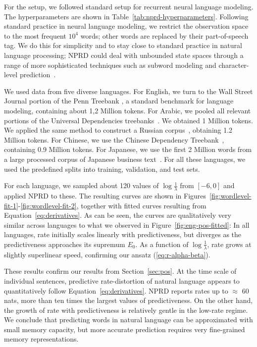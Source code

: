 \documentclass[entropy,article,submit,moreauthors,pdftex,10pt,a4paper]{Definitions/mdpi}
\begin{document}
For the setup, we followed standard setup for recurrent neural language modeling.
The hyperparameters are shown in Table~\ref{tab:nprd-hyperparameters}.
Following standard practice in neural language modeling, we restrict the observation space to the most frequent $10^4$ words; other words are replaced by their part-of-speech tag.
We do this for simplicity and to stay close to standard practice in natural language processing; NPRD could deal with unbounded state spaces through a range of more sophisticated techniques such as subword modeling and character-level prediction~\citep{kim2016character, luong2016achieving}.


We used data from five diverse languages.
For English, we turn to the Wall Street Journal portion of the Penn Treebank \citep{marcus-building-1993}, a standard benchmark for language modeling, containing about 1,2 Million tokens.
For Arabic, we pooled all relevant portions of the Universal Dependencies treebanks~\citep{nivre-universal-2016,maamouri2004penn, hajic2004prague}. We obtained 1 Million tokens.
We applied the same method to construct a Russian corpus~\citep{syntagrus}, obtaining 1.2 Million tokens.
For Chinese, we use the Chinese Dependency Treebank~\citep{che2012chinese}, containing 0.9 Million tokens.
For Japanese, we use the first 2 Million words from a large processed corpus of Japanese business text~\citep{graff1995japanese}.
For all these languages, we used the predefined splits into training, validation, and test sets.

For each language, we sampled about 120 values of $\log \frac{1}{\lambda}$ from $[-6, 0]$ and applied NPRD to these.
The resulting curves are shown in Figures~\ref{fig:wordlevel-fit-1}-\ref{fig:wordlevel-fit-2}, together with fitted curves resulting from Equation~\ref{eq:derivatives}.
As can be seen, the curves are qualitatively very similar across languages to what we observed in Figure~\ref{fig:eng-pos-fitted}:
In all languages, rate initially scales linearly with predictiveness, but diverges as the predictiveness approaches its supremum $E_0$.
As a function of $\log \frac{1}{\lambda}$, rate grows at slightly superlinear speed, confirming our ansatz (\ref{eq:r-alpha-beta}).

These results confirm our results from Section~\ref{sec:pos}.
At the time scale of individual sentences, predictive rate-distortion of natural language appears to quantitatively follow Equation~\ref{eq:derivatives}.
NPRD reports rates up to $\approx$ 60 nats, more than ten times the largest values of predictiveness.
On the other hand, the growth of rate with predictiveness is relatively gentle in the low-rate regime.
We conclude that predicting words in natural language can be approximated with small memory capacity, but more accurate prediction requires very fine-grained memory representations.
\end{document}
